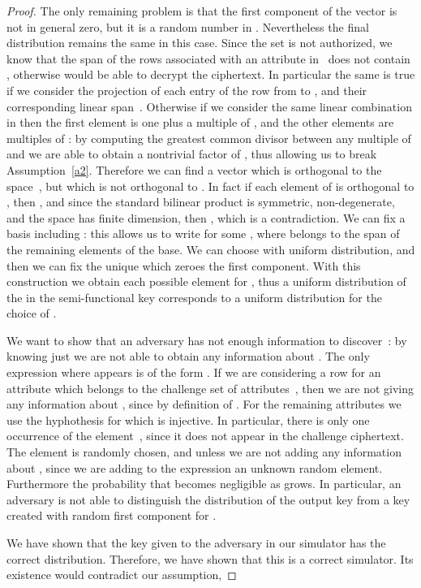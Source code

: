 \documentclass[a4paper,10pt]{article}
\begin{document}
\begin{proof}
		The only remaining problem is that the first component of the vector  is not in general zero, but it is a random number in . Nevertheless the final distribution remains the same in this case. 
Since the set  is not authorized, we know that the span of the rows associated with an attribute in~ does not contain , otherwise  would be able to decrypt the ciphertext.
		In particular the same is true if we consider the projection of each entry of the row from  to , and their corresponding linear span~. Otherwise if we consider the same linear combination in  then the first element is one plus a multiple of , and the other elements are multiples of : by computing the greatest common divisor between any multiple of  and  we are able to obtain a nontrivial factor of , thus allowing us to break Assumption~\ref{a2}.
		Therefore we can find a vector  which is orthogonal to the space~, but which is not orthogonal to . In fact if each element of  is orthogonal to , then , and since the standard bilinear product is symmetric, non-degenerate, and the space has finite dimension, then , which is a contradiction. We can fix a basis including : this allows us to write  for some , where  belongs to the span of the remaining elements of the base. We can choose  with uniform distribution, and then we can fix the unique  which zeroes the first component.
		 With this construction we obtain each possible element for , thus a uniform distribution of the  in the semi-functional key corresponds to a uniform distribution for the choice of . 
		
		We want to show that an adversary has not enough information to discover~: by knowing just  we are not able to obtain any information about .
		The only expression where  appears is of the form .
		If we are considering a row  for an attribute which belongs to the challenge set of attributes~, then we are not giving any information about , since  by definition of .
		For the remaining attributes we use the hyphothesis for which  is injective. In particular, there is only one occurrence of the element~, since it does not appear in the challenge ciphertext.
		The element  is randomly chosen, and unless  we are not adding any information about , since we are adding to the expression an unknown random element.
		Furthermore the probability that  becomes negligible as  grows.
		In particular, an adversary is not able to distinguish the distribution of the output key from a key created with random first component for .
		
		We have shown that the key given to the adversary in our simulator has the correct distribution. Therefore, we have shown that this is a correct simulator. Its existence would contradict our assumption, 
	\end{proof}
\end{document}
